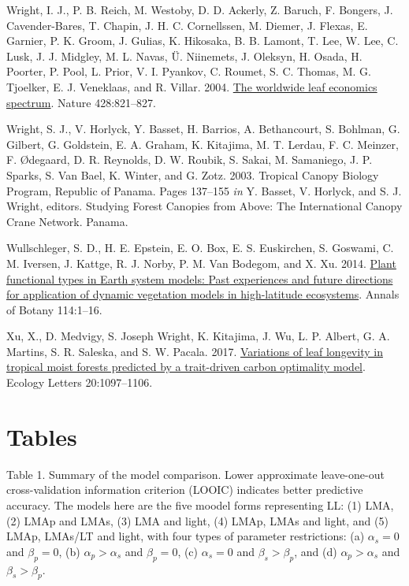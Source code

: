 \documentclass[
  12pt,
  a4paper,
,tablecaptionabove
]{scrartcl}
\newlength{\cslhangindent}
\newenvironment{CSLReferences}[2] %
 {%
  \setlength{\parindent}{0pt}
  \ifodd #1 \everypar{\setlength{\hangindent}{\cslhangindent}}\ignorespaces\fi
  \ifnum #2 > 0
  \setlength{\parskip}{#2\baselineskip}
  \fi
 }%
 {}
\begin{document}
\begin{CSLReferences}{1}{0}
\leavevmode{}%
Wright, I. J., P. B. Reich, M. Westoby, D. D. Ackerly, Z. Baruch, F. Bongers, J. Cavender-Bares, T. Chapin, J. H. C. Cornellssen, M. Diemer, J. Flexas, E. Garnier, P. K. Groom, J. Gulias, K. Hikosaka, B. B. Lamont, T. Lee, W. Lee, C. Lusk, J. J. Midgley, M. L. Navas, Ü. Niinemets, J. Oleksyn, H. Osada, H. Poorter, P. Pool, L. Prior, V. I. Pyankov, C. Roumet, S. C. Thomas, M. G. Tjoelker, E. J. Veneklaas, and R. Villar. 2004. \href{https://doi.org/10.1038/nature02403}{The worldwide leaf economics spectrum}. Nature 428:821--827.

\leavevmode{}%
Wright, S. J., V. Horlyck, Y. Basset, H. Barrios, A. Bethancourt, S. Bohlman, G. Gilbert, G. Goldstein, E. A. Graham, K. Kitajima, M. T. Lerdau, F. C. Meinzer, F. Ødegaard, D. R. Reynolds, D. W. Roubik, S. Sakai, M. Samaniego, J. P. Sparks, S. Van Bael, K. Winter, and G. Zotz. 2003. Tropical {Canopy Biology Program}, {Republic} of {Panama}. Pages 137--155 \emph{in} Y. Basset, V. Horlyck, and S. J. Wright, editors. Studying {Forest Canopies} from {Above}: {The International Canopy Crane Network}. {Panama}.

\leavevmode{}%
Wullschleger, S. D., H. E. Epstein, E. O. Box, E. S. Euskirchen, S. Goswami, C. M. Iversen, J. Kattge, R. J. Norby, P. M. Van Bodegom, and X. Xu. 2014. \href{https://doi.org/10.1093/aob/mcu077}{Plant functional types in {Earth} system models: {Past} experiences and future directions for application of dynamic vegetation models in high-latitude ecosystems}. Annals of Botany 114:1--16.

\leavevmode{}%
Xu, X., D. Medvigy, S. Joseph Wright, K. Kitajima, J. Wu, L. P. Albert, G. A. Martins, S. R. Saleska, and S. W. Pacala. 2017. \href{https://doi.org/10.1111/ele.12804}{Variations of leaf longevity in tropical moist forests predicted by a trait-driven carbon optimality model}. Ecology Letters 20:1097--1106.

\end{CSLReferences}

\newpage

\hypertarget{tables}{%
\section{Tables}\label{tables}}

Table 1. Summary of the model comparison.
Lower approximate leave-one-out cross-validation information criterion (LOOIC) indicates better predictive accuracy.
The models here are the five moodel forms representing LL:
(1) LMA,
(2) LMAp and LMAs,
(3) LMA and light,
(4) LMAp, LMAs and light, and
(5) LMAp, LMAs/LT and light, with four types of parameter restrictions:
(a) \(\alpha_s = 0\) and \(\beta_p = 0\),
(b) \(\alpha_p > \alpha_s\) and \(\beta_p = 0\),
(c) \(\alpha_s = 0\) and \(\beta_s > \beta_p\), and
(d) \(\alpha_p > \alpha_s\) and \(\beta_s > \beta_p\).
\end{document}
